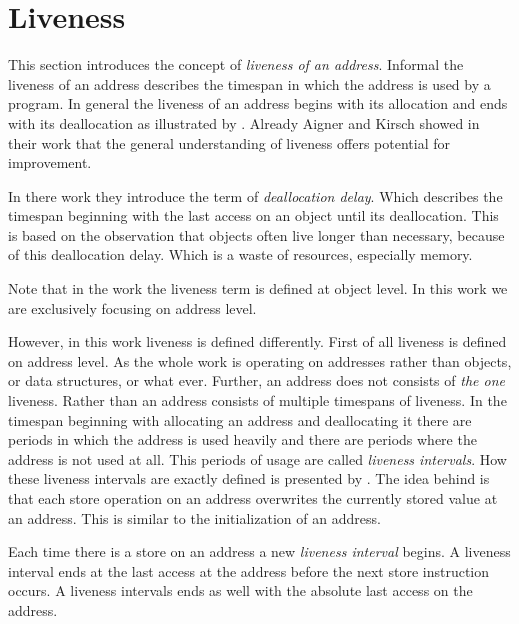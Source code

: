 \documentclass[onecolumn, openright, master, english, signatures]{dbrgrptt}
\begin{document}
\section{Liveness}\label{sec:liveness}

This section introduces the concept of \emph{liveness of an address}. Informal the liveness of an address describes the timespan in which the address is used by a program. In general the liveness of an address begins with its allocation and ends with its deallocation as illustrated by . Already Aigner and Kirsch showed in their work \cite{aigner2013acdc} that the general understanding of liveness offers potential for improvement.

In there work they introduce the term of \emph{deallocation delay}. Which describes the timespan beginning with the last access on an object until its deallocation. This is based on the observation that objects often live longer than necessary, because of this deallocation delay. Which is a waste of resources, especially memory.

\begin{remark}
Note that in the work \cite{aigner2013acdc} the liveness term is defined at object level. In this work we are exclusively focusing on address level.
\end{remark}

However, in this work liveness is defined differently. First of all liveness is defined on address level. As the whole work is operating on addresses rather than objects, or data structures, or what ever. Further, an address does not consists of \emph{the one} liveness. Rather than an address consists of multiple timespans of liveness. In the timespan beginning with allocating an address and deallocating it there are periods in which the address is used heavily and there are periods where the address is not used at all. This periods of usage are called \emph{liveness intervals}. How these liveness intervals are exactly defined is presented by . The idea behind is that each store operation on an address overwrites the currently stored value at an address. This is similar to the initialization of an address.

\begin{definition}\label{def:liveness-interval}
Each time there is a store on an address a new \emph{liveness interval} begins. A liveness interval ends at the last access at the address before the next store instruction occurs. A liveness intervals ends as well with the absolute last access on the address.
\end{definition}
\end{document}
